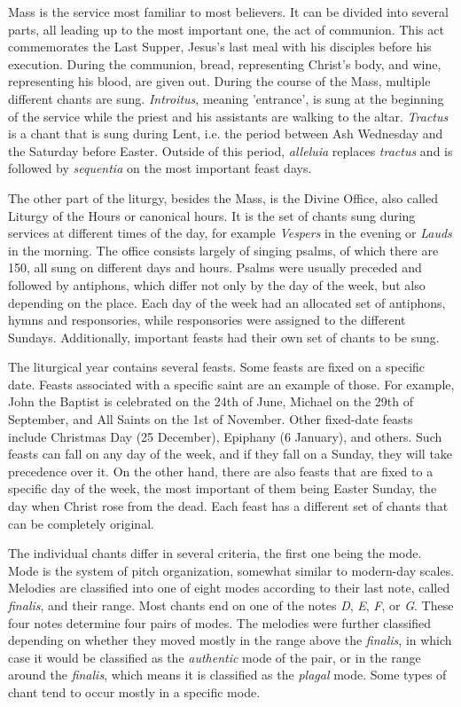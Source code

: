 Mass is the service most familiar to most believers.
It can be divided into several parts, all leading up to the most important one, the act of communion. This act commemorates the Last Supper,
Jesus's last meal with his disciples before his execution. During the communion, bread, representing Christ's body, and wine, representing his
blood, are given out. During the course of the Mass, multiple different chants are sung. \emph{Introitus}, meaning 'entrance', is sung at the beginning
of the service while the priest and his assistants are walking to the altar. \emph{Tractus} is a chant that is sung during Lent, i.e. the period
between Ash Wednesday and the Saturday before Easter. Outside of this period, \emph{alleluia} replaces \emph{tractus} and is followed by \emph{sequentia}
on the most important feast days.

The other part of the liturgy, besides the Mass, is the Divine Office, also called Liturgy of the Hours or canonical hours. It is the set of chants
sung during services at different times of the day, for example \emph{Vespers} in the evening or \emph{Lauds} in the morning. The office consists
largely of singing psalms, of which there are 150, all sung on different days and hours. Psalms were usually preceded and followed by antiphons,
which differ not only by the day of the week, but also depending on the place. Each day of the week had an allocated set of antiphons, hymns and
responsories, while responsories were assigned to the different Sundays. Additionally, important feasts had their own set of chants to be sung.

The liturgical year contains several feasts. Some feasts are fixed on a specific date. Feasts associated with a specific saint are an example of those.
For example, John the Baptist is celebrated on the 24th of June, Michael on the 29th of September, and All Saints on the 1st of November. Other
fixed-date feasts include Christmas Day (25 December), Epiphany (6 January), and others. Such feasts can fall on any day of the week, and if they fall
on a Sunday, they will take precedence over it. On the other hand, there are also feasts that are fixed to a specific day of the week, the most important
of them being Easter Sunday, the day when Christ rose from the dead. Each feast has a different set of chants that can be completely original.

The individual chants differ in several criteria, the first one being the mode. Mode is the system of pitch organization, somewhat similar to modern-day
scales. Melodies are classified into one of eight modes according to their last note, called \emph{finalis}, and their range. Most chants
end on one of the notes \emph{D}, \emph{E}, \emph{F}, or \emph{G}. These four notes determine four pairs of modes. The melodies were further classified
depending on whether they moved mostly in the range above the \emph{finalis}, in which case it would be classified as the \emph{authentic} mode
of the pair, or in the range around the \emph{finalis}, which means it is classified as the \emph{plagal} mode. Some types of chant tend to
occur mostly in a specific mode.

